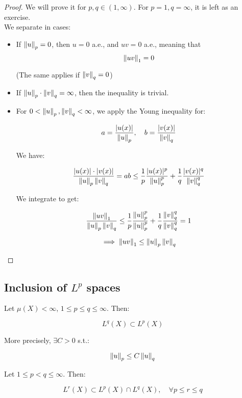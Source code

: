 \begin{proof}
    We will prove it for $p, q \in (1, \infty)$. For $p = 1, q = \infty$, it
    is left as an exercise.\\
    
    We separate in cases:
    \begin{itemize}
        \item If $\left\|u\right\|_p = 0$, then $u = 0$ a.e., and $uv = 0$ a.e., meaning that
        $$\left\|uv\right\|_1 = 0$$

        (The same applies if $\left\|v\right\|_q = 0$)

        \item If $\left\|u\right\|_p \cdot \left\|v\right\|_q = \infty$, then the inequality is trivial.
        
        \item For $0 < \left\|u\right\|_p, \left\|v\right\|_q < \infty$, we apply the Young inequality for:
        
        $$a = \frac{|u(x)|}{\left\|u\right\|_p}, \quad b = \frac{|v(x)|}{\left\|v\right\|_q}$$

        We have:

        $$\frac{|u(x)| \cdot |v(x)|}{\left\|u\right\|_p \left\|v\right\|_q} = a b \leq \frac{1}{p} \frac{|u(x)|^p}{\left\|u\right\|_p^p} + \frac{1}{q} \frac{|v(x)|^q}{\left\|v\right\|_q^q}$$

        We integrate to get:

        $$\frac{\left\|uv\right\|_1}{\left\|u\right\|_p \left\|v\right\|_q} \leq \frac{1}{p} \frac{\left\|u\right\|_p^p}{\left\|u\right\|_p^p} + \frac{1}{q} \frac{\left\|v\right\|_q^q}{\left\|v\right\|_q^q} = 1$$

        $$\implies \left\|uv\right\|_1 \leq \left\|u\right\|_p \left\|v\right\|_q$$
    \end{itemize}
\end{proof}

\subsection{Inclusion of $L^p$ spaces}

\begin{ftheorem}
    Let $\mu(X) < \infty$, $1 \leq p \leq q \leq \infty$. Then:

    $$L^q(X) \subset L^p(X)$$

    More precisely, $\exists C > 0$ s.t.:

    $$\left\|u\right\|_p \leq C \left\|u\right\|_q$$
\end{ftheorem}

\begin{ftheorem}[Interpolation]
    Let $1 \leq p < q \leq \infty$. Then:

    $$L^r(X) \subset L^p(X) \cap L^q(X), \quad \forall p \leq r \leq q$$
\end{ftheorem}

